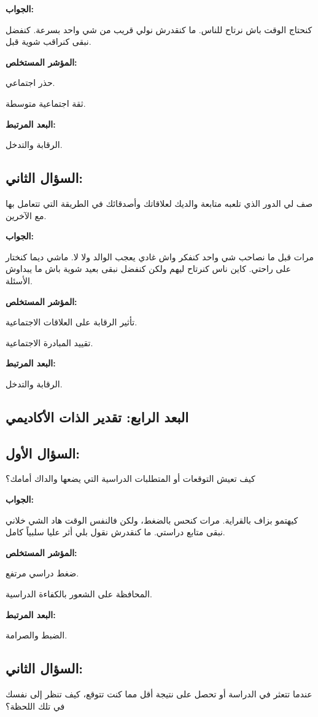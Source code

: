 \documentclass[12pt,oneside]{report}
\begin{document}
\noindent\textbf{الجواب:}\par
كنحتاج الوقت باش نرتاح للناس. ما كنقدرش نولي قريب من شي واحد بسرعة. كنفضل نبقى كنراقب شوية قبل.

\noindent\textbf{المؤشر المستخلص:}\par
حذر اجتماعي.

ثقة اجتماعية متوسطة.

\noindent\textbf{البعد المرتبط:}\par
الرقابة والتدخل.

\subsection*{السؤال الثاني:}
صف لي الدور الذي تلعبه متابعة والديك لعلاقاتك وأصدقائك في الطريقة التي تتعامل بها مع الآخرين.

\noindent\textbf{الجواب:}\par
مرات قبل ما نصاحب شي واحد كنفكر واش غادي يعجب الوالد ولا لا. ماشي ديما كنختار على راحتي. كاين ناس كنرتاح ليهم ولكن كنفضل نبقى بعيد شوية باش ما يبداوش الأسئلة.

\noindent\textbf{المؤشر المستخلص:}\par
تأثير الرقابة على العلاقات الاجتماعية.

تقييد المبادرة الاجتماعية.

\noindent\textbf{البعد المرتبط:}\par
الرقابة والتدخل.

\subsection*{البعد الرابع: تقدير الذات الأكاديمي}
\subsection*{السؤال الأول:}
كيف تعيش التوقعات أو المتطلبات الدراسية التي يضعها والداك أمامك؟

\noindent\textbf{الجواب:}\par
كيهتمو بزاف بالقراية. مرات كنحس بالضغط، ولكن فالنفس الوقت هاد الشي خلاني نبقى متابع دراستي. ما كنقدرش نقول بلي أثر عليا سلبياً كامل.

\noindent\textbf{المؤشر المستخلص:}\par
ضغط دراسي مرتفع.

المحافظة على الشعور بالكفاءة الدراسية.

\noindent\textbf{البعد المرتبط:}\par
الضبط والصرامة.

\subsection*{السؤال الثاني:}
عندما تتعثر في الدراسة أو تحصل على نتيجة أقل مما كنت تتوقع، كيف تنظر إلى نفسك في تلك اللحظة؟
\end{document}
